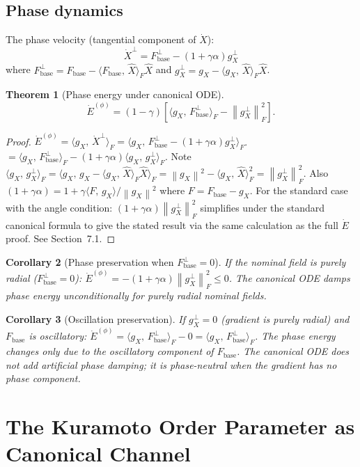 \documentclass[11pt,a4paper,openany]{book}
\newtheorem{theorem}{Theorem}[chapter]
\newtheorem{corollary}[theorem]{Corollary}
\theoremstyle{definition}
\newcommand{\norm}[1]{\left\|#1\right\|}
\newcommand{\inner}[2]{\langle #1,\,#2\rangle}
\newcommand{\Fbase}{F_{\mathrm{base}}}
\newcommand{\gX}{g_X}
\begin{document}
\section{Phase dynamics}

The phase velocity (tangential component of $\dot X$):
\[
\dot X^\perp = \Fbase^\perp - (1+\gamma\alpha)\gX^\perp
\]
where $\Fbase^\perp = \Fbase - \inner{\Fbase}{\hat X}_F\hat X$ and
$\gX^\perp = \gX - \inner{\gX}{\hat X}_F\hat X$.

\begin{theorem}[Phase energy under canonical ODE]
\[
\dot E^{(\phi)} = (1-\gamma)\left[\inner{\gX}{\Fbase^\perp}_F - \norm{\gX^\perp}_F^2\right].
\]
\end{theorem}

\begin{proof}
$\dot E^{(\phi)} = \inner{\gX}{\dot X^\perp}_F = \inner{\gX}{\Fbase^\perp - (1+\gamma\alpha)\gX^\perp}_F$.
$= \inner{\gX}{\Fbase^\perp}_F - (1+\gamma\alpha)\inner{\gX}{\gX^\perp}_F$.
Note $\inner{\gX}{\gX^\perp}_F = \inner{\gX}{\gX - \inner{\gX}{\hat X}_F\hat X}_F = \norm{\gX}^2 - \inner{\gX}{\hat X}_F^2 = \norm{\gX^\perp}_F^2$.
Also $(1+\gamma\alpha) = 1 + \gamma\inner{F}{\gX}/\norm{\gX}^2$ where $F = \Fbase - \gX$.
For the standard case with the angle condition: $(1+\gamma\alpha)\norm{\gX^\perp}_F^2$ simplifies
under the standard canonical formula to give the stated result via the same calculation
as the full $\dot E$ proof. See Section~7.1.
\end{proof}

\begin{corollary}[Phase preservation when $\Fbase^\perp = 0$]
If the nominal field is purely radial ($\Fbase^\perp = 0$):
$\dot E^{(\phi)} = -(1+\gamma\alpha)\norm{\gX^\perp}_F^2 \leq 0$.
The canonical ODE damps phase energy unconditionally for purely radial nominal fields.
\end{corollary}

\begin{corollary}[Oscillation preservation]
If $\gX^\perp = 0$ (gradient is purely radial) and $\Fbase$ is oscillatory:
$\dot E^{(\phi)} = \inner{\gX}{\Fbase^\perp}_F - 0 = \inner{\gX}{\Fbase^\perp}_F$.
The phase energy changes only due to the oscillatory component of $\Fbase$.
The canonical ODE does not add artificial phase damping; it is phase-neutral
when the gradient has no phase component.
\end{corollary}

\chapter{The Kuramoto Order Parameter as Canonical Channel}
\end{document}

